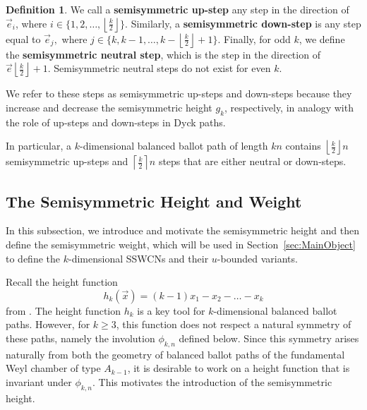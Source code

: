 \documentclass[11pt]{article}
\theoremstyle{remark}
\theoremstyle{definition}
\newtheorem{definition}[theorem]{Definition}
\begin{document}
\begin{definition}
\label{defn:up-step-down-step}
We call a \textbf{semisymmetric up-step} any step in the direction of $\vec{e}_i$, where $i \in \{1,2,\ldots, \left\lfloor \frac{k}{2}\right\rfloor \}.$ Similarly, a \textbf{semisymmetric down-step} is any step equal to $\vec{e}_j,$ where $j \in \{k , k-1, \dots, k - \left\lfloor \frac{k}{2} \right\rfloor+1\}$. Finally, for odd $k$, we define the \textbf{semisymmetric neutral step}, which is the step in the direction of $\vec{e}{\left \lfloor\frac{k}{2}\right\rfloor+1}$. Semisymmetric neutral steps do not exist for even $k$.
\end{definition}
We refer to these steps as semisymmetric up-steps and down-steps because they increase and decrease the semisymmetric height $g_k$, respectively, in analogy with the role of up-steps and down-steps in Dyck paths.

In particular, a $k$-dimensional balanced ballot path of length $kn$ contains $\left\lfloor \frac{k}{2}\right\rfloor n$ semisymmetric up-steps and $\left\lceil \frac{k}{2}\right\rceil n$ steps that are either neutral or down-steps.
\subsection{The Semisymmetric Height and Weight}\label{sec:ssheight}
In this subsection, we introduce and motivate the semisymmetric height and then define the semisymmetric weight, which will be used in Section~\ref{sec:MainObject} to define the $k$-dimensional SSWCNs and their $u$-bounded variants.

Recall the height function $$h_k(\vec{x}) = (k-1)x_1 -x_2-\dots-x_k$$ from \cite{MR5034574}. The height function $h_k$ is a key tool for $k$-dimensional balanced ballot paths. However, for $k \geq 3$, this function does not respect a natural symmetry of these paths, namely the involution $\phi_{k,n}$ defined below. Since this symmetry arises naturally from both the geometry of balanced ballot paths of the fundamental Weyl chamber of type $A_{k-1}$, it is desirable to work on a height function that is invariant under $\phi_{k,n}$. This motivates the introduction of the semisymmetric height.
\end{document}
